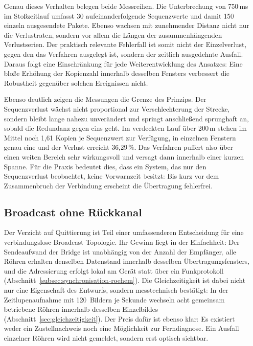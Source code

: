 Genau dieses Verhalten belegen beide Messreihen. Die Unterbrechung von 750\,ms im
Stoßzeitlauf umfasst 30 aufeinanderfolgende Sequenzwerte und damit 150 einzeln
ausgesendete Pakete. Ebenso wachsen mit zunehmender Distanz nicht nur die
Verlustraten, sondern vor allem die Längen der zusammenhängenden Verlustserien.
Der praktisch relevante Fehlerfall ist somit nicht der Einzelverlust, gegen den
das Verfahren ausgelegt ist, sondern der zeitlich ausgedehnte Ausfall. Daraus
folgt eine Einschränkung für jede Weiterentwicklung des Ansatzes: Eine bloße
Erhöhung der Kopienzahl innerhalb desselben Fensters verbessert die Robustheit
gegenüber solchen Ereignissen nicht.

Ebenso deutlich zeigen die Messungen die Grenze des Prinzips. Der Sequenzverlust
wächst nicht proportional zur Verschlechterung der Strecke, sondern bleibt lange
nahezu unverändert und springt anschließend sprunghaft an, sobald die Redundanz
gegen eins geht. Im verdeckten Lauf über 200\,m stehen im Mittel noch 1,61 Kopien
je Sequenzwert zur Verfügung, in einzelnen Fenstern genau eine und der Verlust
erreicht 36,29\,\%. Das Verfahren puffert also über einen weiten Bereich sehr
wirkungsvoll und versagt dann innerhalb einer kurzen Spanne. Für die Praxis
bedeutet dies, dass ein System, das nur den Sequenzverlust beobachtet, keine
Vorwarnzeit besitzt: Bis kurz vor dem Zusammenbruch der Verbindung erscheint die
Übertragung fehlerfrei.

\subsection{Broadcast ohne Rückkanal}
\label{subsec:diskussion-broadcast}

Der Verzicht auf Quittierung ist Teil einer umfassenderen Entscheidung für eine
verbindungslose Broadcast-Topologie. Ihr Gewinn liegt in der Einfachheit: Der
Sendeaufwand der Bridge ist unabhängig von der Anzahl der Empfänger, alle Röhren
erhalten denselben Datenstand innerhalb desselben Übertragungsfensters, und die
Adressierung erfolgt lokal am Gerät statt über ein Funkprotokoll
(Abschnitt~\ref{subsec:synchronisation-roehem}). Die Gleichzeitigkeit ist dabei
nicht nur eine Eigenschaft des Entwurfs, sondern messtechnisch bestätigt: In der
Zeitlupenaufnahme mit 120~Bildern je Sekunde wechseln acht gemeinsam betriebene
Röhren innerhalb desselben Einzelbildes
(Abschnitt~\ref{sec:gleichzeitigkeit}). Der Preis dafür ist ebenso klar:
Es existiert weder ein Zustellnachweis noch eine Möglichkeit zur Ferndiagnose. Ein
Ausfall einzelner Röhren wird nicht gemeldet, sondern erst optisch sichtbar.

